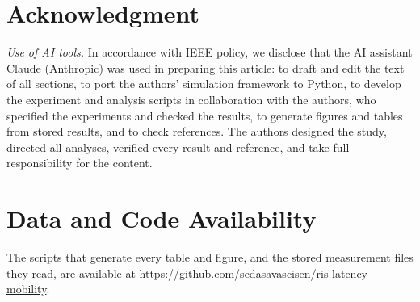 \documentclass[journal]{IEEEtran}
\begin{document}








\section*{Acknowledgment}
\emph{Use of AI tools.} In accordance with IEEE policy, we disclose that the AI assistant Claude (Anthropic) was used in preparing this article: to draft and edit the text of all sections, to port the authors' simulation framework to Python, to develop the experiment and analysis scripts in collaboration with the authors, who specified the experiments and checked the results, to generate figures and tables from stored results, and to check references. The authors designed the study, directed all analyses, verified every result and reference, and take full responsibility for the content.

\section*{Data and Code Availability}
The scripts that generate every table and figure, and the stored measurement files they read, are available at \url{https://github.com/sedasavascisen/ris-latency-mobility}.



\end{document}
